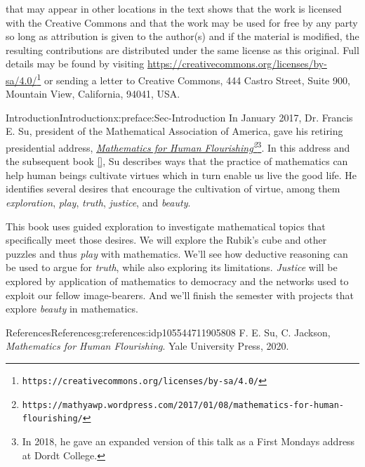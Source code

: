 \documentclass[oneside,10pt,]{book}
\newcommand{\xreffont}{\relax}
\numberwithin{equation}{section}
\begin{document}
 that may appear in other locations in the text shows that the work is licensed with the Creative Commons and that the work may be used for free by any party so long as attribution is given to the author(s) and if the material is modified, the resulting contributions are distributed under the same license as this original. Full details may be found by visiting \href{https://creativecommons.org/licenses/by-sa/4.0/}{https:\slash{}\slash{}creativecommons.org\slash{}licenses\slash{}by-sa\slash{}4.0\slash{}}\footnote{\nolinkurl{https://creativecommons.org/licenses/by-sa/4.0/}\label{g:fn:idp105544711898896}}  or sending a letter to Creative Commons, 444 Castro Street, Suite 900, Mountain View, California, 94041, USA.\par\medskip
{}
\null\clearpage
%
%
\typeout{************************************************}
\typeout{************************************************}
%
\begin{preface}{Introduction}{}{Introduction}{}{}{x:preface:Sec-Introduction}
In January 2017, Dr. Francis E. Su, president of the Mathematical Association of America, gave his retiring presidential address, \emph{\href{https://mathyawp.wordpress.com/2017/01/08/mathematics-for-human-flourishing/}{Mathematics for Human Flourishing}\footnote{\nolinkurl{https://mathyawp.wordpress.com/2017/01/08/mathematics-for-human-flourishing/}\label{g:fn:idp105544711900816}}}\footnote{In 2018, he gave an expanded version of this talk as a First Mondays address at Dordt College.\label{g:fn:idp105544711901072}}. In this address and the subsequent book \hyperlink{x:biblio:Su2020}{[{\xreffont 1}]}, Su describes ways that the practice of mathematics can help human beings cultivate virtues which in turn enable us live the good life. He identifies several desires that encourage the cultivation of virtue, among them \emph{exploration}, \emph{play}, \emph{truth}, \emph{justice}, and \emph{beauty}.%
\par
This book uses guided exploration to investigate mathematical topics that specifically meet those desires. We will explore the Rubik's cube and other puzzles and thus \emph{play} with mathematics. We'll see how deductive reasoning can be used to argue for \emph{truth}, while also exploring its limitations. \emph{Justice} will be explored by application of mathematics to democracy and the networks used to exploit our fellow image-bearers. And we'll finish the semester with projects that explore \emph{beauty} in mathematics.%
%
%
\typeout{************************************************}
\typeout{************************************************}
%
\begin{references--numberless}{References}{}{References}{}{}{g:references:idp105544711905808}
F. E. Su, C. Jackson, \emph{Mathematics for Human Flourishing}. Yale University Press, 2020.\end{references--numberless}
\end{preface}
\end{document}
